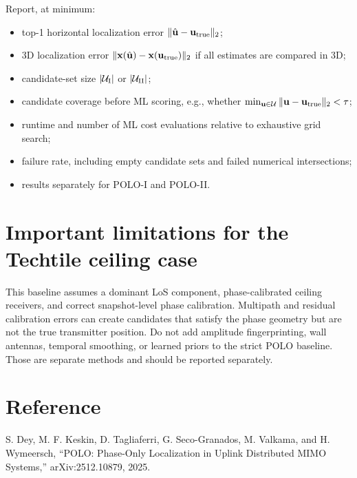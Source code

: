 \documentclass[11pt]{article}
\begin{document}
Report, at minimum:
\begin{itemize}[leftmargin=*]
    \item top-1 horizontal localization error $\|\hat{\mathbf{u}}-\mathbf{u}_{\rm true}\|_2$;
    \item 3D localization error $\|\mathbf{x}(\hat{\mathbf{u}})-\mathbf{x}(\mathbf{u}_{\rm true})\|_2$ if all estimates are compared in 3D;
    \item candidate-set size $|\mathcal{U}_{\rm I}|$ or $|\mathcal{U}_{\rm II}|$;
    \item candidate coverage before ML scoring, e.g., whether $\min_{\mathbf{u}\in\mathcal{U}}\|\mathbf{u}-\mathbf{u}_{\rm true}\|_2<\tau$;
    \item runtime and number of ML cost evaluations relative to exhaustive grid search;
    \item failure rate, including empty candidate sets and failed numerical intersections;
    \item results separately for POLO-I and POLO-II.
\end{itemize}

\section{Important limitations for the Techtile ceiling case}

This baseline assumes a dominant LoS component, phase-calibrated ceiling receivers, and correct snapshot-level phase calibration. Multipath and residual calibration errors can create candidates that satisfy the phase geometry but are not the true transmitter position. Do not add amplitude fingerprinting, wall antennas, temporal smoothing, or learned priors to the strict POLO baseline. Those are separate methods and should be reported separately.

\section{Reference}

S. Dey, M. F. Keskin, D. Tagliaferri, G. Seco-Granados, M. Valkama, and H. Wymeersch, ``POLO: Phase-Only Localization in Uplink Distributed MIMO Systems,'' arXiv:2512.10879, 2025.
\end{document}
